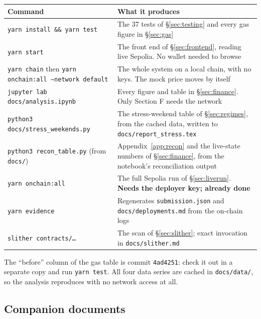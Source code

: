 \documentclass[11pt,a4paper]{article}
\begin{document}
\begin{center}
\small
\begin{tabular}{@{}p{6.0cm}p{9.2cm}@{}}
\toprule
\textbf{Command} & \textbf{What it produces} \\
\midrule
\texttt{yarn install \&\& yarn test} & The 37 tests of \S\ref{sec:testing} and every gas figure in \S\ref{sec:gas} \\
\texttt{yarn start} & The front end of \S\ref{sec:frontend}, reading live Sepolia. No wallet needed to browse \\
\texttt{yarn chain} then \texttt{yarn onchain:all --network default} & The whole system on a local chain, with no keys. The mock price moves by itself \\
\texttt{jupyter lab docs/analysis.ipynb} & Every figure and table in \S\ref{sec:finance}. Only Section F needs the network \\
\texttt{python3 docs/stress\_weekends.py} & The stress-weekend table of \S\ref{sec:regimes}, from the cached data, written to \texttt{docs/report\_stress.tex} \\
\texttt{python3 recon\_table.py} (from \texttt{docs/}) & Appendix~\ref{app:recon} and the live-state numbers of \S\ref{sec:finance}, from the notebook's reconciliation output \\
\texttt{yarn onchain:all} & The full Sepolia run of \S\ref{sec:liverun}. \textbf{Needs the deployer key; already done} \\
\texttt{yarn evidence} & Regenerates \texttt{submission.json} and \texttt{docs/deployments.md} from the on-chain logs \\
\texttt{slither contracts/\ldots} & The scan of \S\ref{sec:slither}; exact invocation in \texttt{docs/slither.md} \\
\bottomrule
\end{tabular}
\end{center}

The ``before'' column of the gas table is commit \texttt{4ad4251}: check it out in a separate copy
and run \texttt{yarn test}. All four data series are cached in \texttt{docs/data/}, so the analysis
reproduces with no network access at all.

\subsection*{Companion documents}
\end{document}
